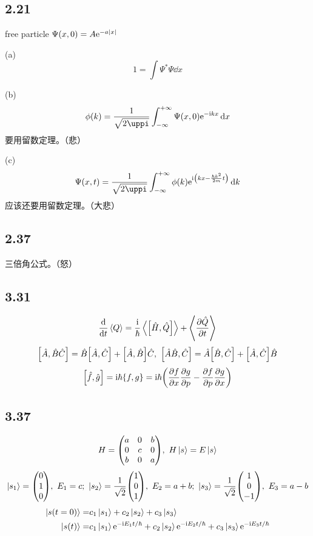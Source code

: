 \subsection{2.21}
\begin{framed}
    free particle $\Psi(x, 0) = A \mathrm{e}^{- a \qty|x|}$

    (a)
    \[
    1 = \int \Psi^* \Psi \dd{x}
    \]

    (b)
    \[
    \phi(k) = \frac{1}{\sqrt{2 \uppi}} \int^{+ \infty}_{- \infty} \Psi(x, 0) \rme^{- \rmi k x} \dd{x}
    \] 要用留数定理。（悲）

    (c)
    \[
    \Psi(x, t) = \frac{1}{\sqrt{2 \uppi}} \int^{+ \infty}_{- \infty} \phi(k) \rme^{\rmi \qty(k x - \frac{\hbar k^2}{2 m} t)} \dd{k}
    \] 应该还要用留数定理。（大悲）
\end{framed}

\subsection{2.37}

\begin{framed}
    三倍角公式。（怒）
\end{framed}

\subsection{3.31}
\begin{framed}
    \[
    \dv{t} \expval{Q} = \frac{\mathrm{i}}{\hbar} \expval{\qty[\hat{H}, \hat{Q}]} + \expval{\pdv{\hat{Q}}{t}}
    \] \[
    \qty[\hat{A}, \hat{B} \hat{C}] = \hat{B} \qty[\hat{A}, \hat{C}] + \qty[\hat{A}, \hat{B}] \hat{C},\ \qty[\hat{A} \hat{B}, \hat{C}] = \hat{A} \qty[\hat{B}, \hat{C}] + \qty[\hat{A}, \hat{C}] \hat{B}
    \] \[
    \qty[\hat{f}, \hat{g}] = \mathrm{i} \hbar \qty{f, g} = \mathrm{i} \hbar \qty(\pdv{f}{x} \pdv{g}{p} - \pdv{f}{p} \pdv{g}{x})
    \]
\end{framed}

\subsection{3.37}
\begin{framed}
    \[
    H = \mqty(a & 0 & b \\ 0 & c & 0 \\ b & 0 & a),\ H \ket{s} = E \ket{s}
    \] \[
    \ket{s_1} = \mqty(0 \\ 1 \\ 0),\ E_1 = c;\ \ket{s_2} = \frac{1}{\sqrt{2}} \mqty(1 \\ 0 \\ 1),\ E_2 = a + b;\ \ket{s_3} = \frac{1}{\sqrt{2}} \mqty(1 \\ 0 \\ - 1),\ E_3 = a - b
    \] \begin{align*}
    \ket{s(t = 0)} = & c_1 \ket{s_1} + c_2 \ket{s_2} + c_3 \ket{s_3}\\
    \ket{s(t)} = & c_1 \ket{s_1} \mathrm{e}^{- \mathrm{i} E_1 t / \hbar} + c_2 \ket{s_2} \mathrm{e}^{- \mathrm{i} E_2 t / \hbar} + c_3 \ket{s_3} \mathrm{e}^{- \mathrm{i} E_3 t / \hbar}
    \end{align*}
\end{framed}

